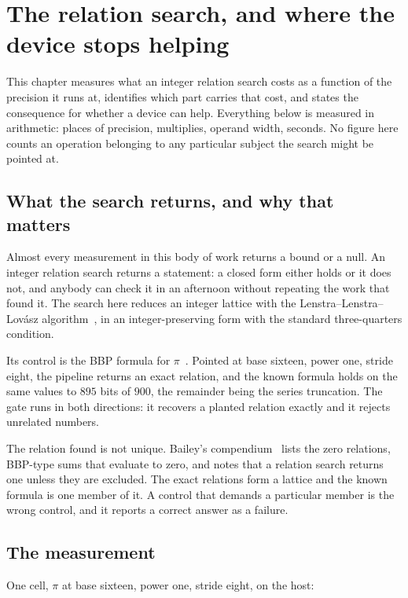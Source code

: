 \chapter{The relation search, and where the device stops helping}

This chapter measures what an integer relation search costs as a function of the precision it runs
at, identifies which part carries that cost, and states the consequence for whether a device can
help. Everything below is measured in arithmetic: places of precision, multiplies, operand width,
seconds. No figure here counts an operation belonging to any particular subject the search might be
pointed at.

\section{What the search returns, and why that matters}

Almost every measurement in this body of work returns a bound or a null. An integer relation search
returns a statement: a closed form either holds or it does not, and anybody can check it in an
afternoon without repeating the work that found it. The search here reduces an integer lattice with
the Lenstra--Lenstra--Lov\'asz algorithm~\cite{src:LLL-1982}, in an integer-preserving form with the
standard three-quarters condition.

Its control is the BBP formula for \(\pi\)~\cite{src:Bailey-Borwein-and-Plouffe-1997}. Pointed at base
sixteen, power one, stride eight, the pipeline returns an exact relation, and the known formula holds
on the same values to \(895\) bits of \(900\), the remainder being the series truncation. The gate runs
in both directions: it recovers a planted relation exactly and it rejects unrelated numbers.

The relation found is not unique. Bailey's compendium~\cite{src:Bailey-2023} lists the zero relations,
BBP-type sums that evaluate to zero, and notes that a relation search returns one unless they are
excluded. The exact relations form a lattice and the known formula is one member of it. A control
that demands a particular member is the wrong control, and it reports a correct answer as a failure.

\section{The measurement}

One cell, \(\pi\) at base sixteen, power one, stride eight, on the host:

